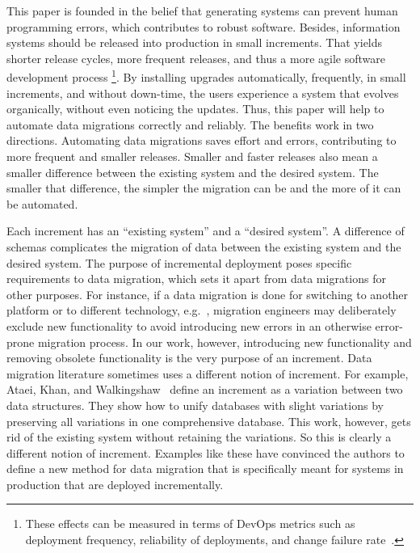 \documentclass{elsarticle}
\begin{document}
   This paper is founded in the belief that generating systems can prevent human programming errors, which contributes to robust software.
   Besides, information systems should be released into production in small increments.
   That yields shorter release cycles, more frequent releases, and thus a more agile software development process%
   \footnote{These effects can be measured in terms of DevOps metrics such as
   deployment frequency,
   reliability of deployments, and
   change failure rate~\cite{DevOps2021}.}.
   By installing upgrades automatically, frequently, in small increments, and without down-time,
   the users experience a system that evolves organically, without even noticing the updates.
   Thus, this paper will help to automate data migrations correctly and reliably.
   The benefits work in two directions.
   Automating data migrations saves effort and errors,
   contributing to more frequent and smaller releases.
   Smaller and faster releases also mean a smaller difference between the existing system and the desired system.
   The smaller that difference, the simpler the migration can be and the more of it can be automated.

   Each increment has an ``existing system'' and a ``desired system''.
   A difference of schemas complicates the migration of data between the existing system and the desired system.
   The purpose of incremental deployment poses specific requirements to data migration,
   which sets it apart from data migrations for other purposes.
   For instance, if a data migration is done for switching to another platform or to different technology,
   e.g.~\cite{Gholami2016,Bisbal1999},
   migration engineers may deliberately exclude new functionality to avoid introducing new errors in an otherwise error-prone migration process.
   In our work, however, introducing new functionality and removing obsolete functionality is the very purpose of an increment.
   Data migration literature sometimes uses a different notion of increment.
   For example, Ataei, Khan, and Walkingshaw~\cite{Ataei2021,Walkingshaw2014} define an increment as a variation between two data structures.
   They show how to unify databases with slight variations by preserving all variations in one comprehensive database.
   This work, however, gets rid of the existing system without retaining the variations.
   So this is clearly a different notion of increment.
   Examples like these have convinced the authors to define a new method for data migration that is specifically meant for systems in production that are
   deployed incrementally.
   
\end{document}
